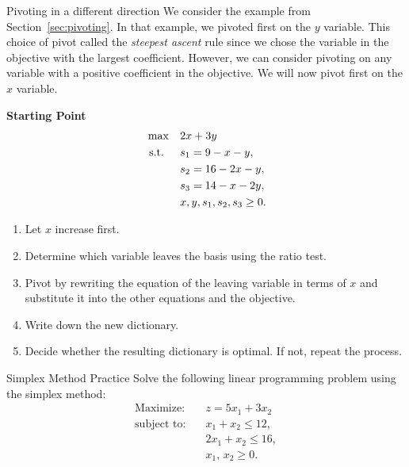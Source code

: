 \begin{ex}{Pivoting in a different direction}{}
\label{ex:alternative-pivot}
 We consider the example from Section~\ref{sec:pivoting}.  In that example, we pivoted first on the $y$ variable.  This choice of pivot called the \emph{steepest ascent} rule since we chose the variable in the objective with the largest coefficient.  
However, we can consider pivoting on any variable with a positive coefficient in the objective.  We will now pivot first on the $x$ variable.  

\textbf{Starting Point}
\[
\begin{aligned}
\max\quad &  2x + 3y \\
\mbox{ s.t. }\quad & s_1 = 9 - x - y, \\
                        & s_2 = 16 - 2x - y, \\
                        & s_3 = 14 - x - 2y, \\
                        & x, y, s_1, s_2, s_3 \ge 0.
\end{aligned}
\]

\begin{enumerate}
    \item Let \(x\) increase first.
    \item Determine which variable leaves the basis using the ratio test.
    \item Pivot by rewriting the equation of the leaving variable in terms of \(x\) and substitute it into the other equations and the objective.
    \item Write down the new dictionary.
    \item Decide whether the resulting dictionary is optimal. If not, repeat the process.
\end{enumerate}
\exrefs{\S\ref{sec:pivoting}; \S\ref{sec:simplex-algorithm}}
\end{ex}

\begin{ex}{Simplex Method Practice}{}
\label{ex:simplex-practice-5-3}
 Solve the following linear programming problem using the simplex method:
\[
\begin{aligned}
\text{Maximize:}\quad & z = 5x_{1} + 3x_{2}\\
\text{subject to:}\quad & x_{1} + x_{2} \le 12,\\
& 2x_{1} + x_{2} \le 16,\\
& x_{1},\, x_{2} \ge 0.
\end{aligned}
\]
\exrefs{\S\ref{sec:pivoting}; \S\ref{sec:simplex-algorithm}}
\end{ex}

